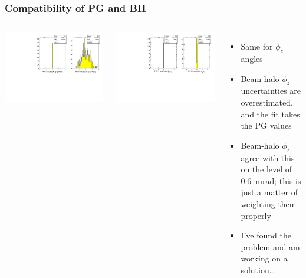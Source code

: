 \documentclass[compress]{beamer}
\begin{document}
\begin{frame}
\frametitle{Compatibility of PG and BH}

\begin{columns}
\includegraphics[width=\linewidth]{allplots_fit_angles.pdf}

\vspace{0.5 cm}
\includegraphics[width=\linewidth]{allplots_fit_anglesNorm.pdf}

\begin{itemize}
\item Same for $\phi_z$ angles

\item Beam-halo $\phi_z$ uncertainties are overestimated, and the fit takes the PG values

\item Beam-halo $\phi_z$ agree with this on the level of 0.6~mrad; this is just a matter of weighting them properly

\item I've found the problem and am working on a solution\ldots
\end{itemize}
\end{columns}
\end{frame}
\end{document}
